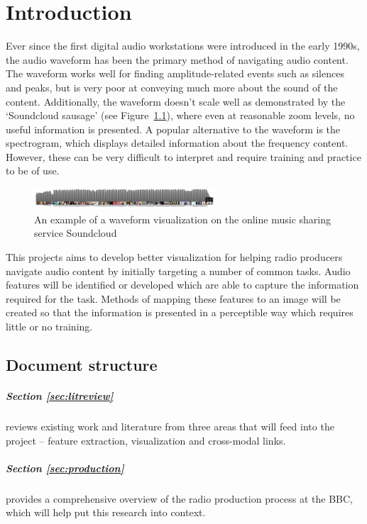 \chapter{Introduction}\label{sec:intro}
Ever since the first digital audio workstations were introduced in the early
1990s, the audio waveform has been the primary method of navigating audio
content. The waveform works well for finding amplitude-related events such as
silences and peaks, but is very poor at conveying much more about the sound of
the content. Additionally, the waveform doesn't scale well as demonstrated by
the `Soundcloud sausage' (see Figure~\ref{fig:soundcloud}), where even at
reasonable zoom levels, no useful information is presented.  A popular
alternative to the waveform is the spectrogram, which displays detailed
information about the frequency content. However, these can be very difficult
to interpret and require training and practice to be of use.

\begin{figure}[ht]
  \centering
  \includegraphics[width=0.6\textwidth]{figs/soundcloud.png}
  \caption{An example of a waveform visualization on the online music sharing
    service Soundcloud}
  \label{fig:soundcloud}
\end{figure}

This projects aims to develop better visualization for helping radio producers
navigate audio content by initially targeting a number of common tasks. Audio
features will be identified or developed which are able to capture the
information required for the task. Methods of mapping these features to an
image will be created so that the information is presented in a perceptible way
which requires little or no training. 

\section{Document structure}

\paragraph{Section \ref{sec:litreview}} reviews existing work and literature
from three areas that will feed into the project -- feature extraction,
visualization and cross-modal links.

\paragraph{Section \ref{sec:production}} provides a comprehensive overview of
the radio production process at the BBC, which will help put this research into
context.

